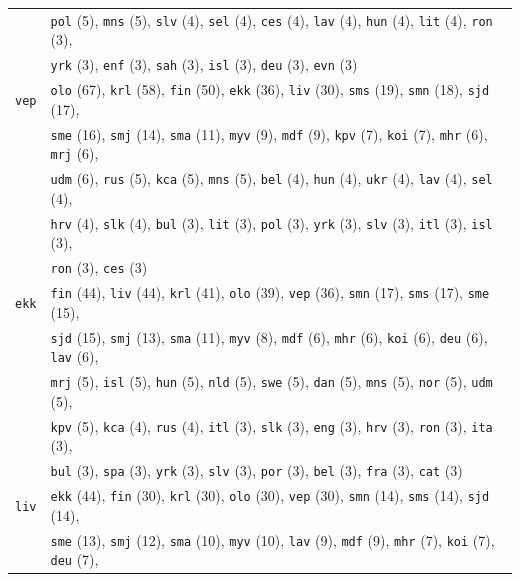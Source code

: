 \begin{center}
\begin{longtable}{ll}
 & \texttt{pol} (5), \texttt{mns} (5), \texttt{slv} (4), \texttt{sel} (4), \texttt{ces} (4), \texttt{lav} (4), \texttt{hun} (4), \texttt{lit} (4), \texttt{ron} (3),\\
 & \texttt{yrk} (3), \texttt{enf} (3), \texttt{sah} (3), \texttt{isl} (3), \texttt{deu} (3), \texttt{evn} (3) \\
\texttt{vep} & \texttt{olo} (67), \texttt{krl} (58), \texttt{fin} (50), \texttt{ekk} (36), \texttt{liv} (30), \texttt{sms} (19), \texttt{smn} (18), \texttt{sjd} (17),\\
 & \texttt{sme} (16), \texttt{smj} (14), \texttt{sma} (11), \texttt{myv} (9), \texttt{mdf} (9), \texttt{kpv} (7), \texttt{koi} (7), \texttt{mhr} (6), \texttt{mrj} (6),\\
 & \texttt{udm} (6), \texttt{rus} (5), \texttt{kca} (5), \texttt{mns} (5), \texttt{bel} (4), \texttt{hun} (4), \texttt{ukr} (4), \texttt{lav} (4), \texttt{sel} (4),\\
 & \texttt{hrv} (4), \texttt{slk} (4), \texttt{bul} (3), \texttt{lit} (3), \texttt{pol} (3), \texttt{yrk} (3), \texttt{slv} (3), \texttt{itl} (3), \texttt{isl} (3),\\
 & \texttt{ron} (3), \texttt{ces} (3) \\
\texttt{ekk} & \texttt{fin} (44), \texttt{liv} (44), \texttt{krl} (41), \texttt{olo} (39), \texttt{vep} (36), \texttt{smn} (17), \texttt{sms} (17), \texttt{sme} (15),\\
 & \texttt{sjd} (15), \texttt{smj} (13), \texttt{sma} (11), \texttt{myv} (8), \texttt{mdf} (6), \texttt{mhr} (6), \texttt{koi} (6), \texttt{deu} (6), \texttt{lav} (6),\\
 & \texttt{mrj} (5), \texttt{isl} (5), \texttt{hun} (5), \texttt{nld} (5), \texttt{swe} (5), \texttt{dan} (5), \texttt{mns} (5), \texttt{nor} (5), \texttt{udm} (5),\\
 & \texttt{kpv} (5), \texttt{kca} (4), \texttt{rus} (4), \texttt{itl} (3), \texttt{slk} (3), \texttt{eng} (3), \texttt{hrv} (3), \texttt{ron} (3), \texttt{ita} (3),\\
 & \texttt{bul} (3), \texttt{spa} (3), \texttt{yrk} (3), \texttt{slv} (3), \texttt{por} (3), \texttt{bel} (3), \texttt{fra} (3), \texttt{cat} (3) \\
\texttt{liv} & \texttt{ekk} (44), \texttt{fin} (30), \texttt{krl} (30), \texttt{olo} (30), \texttt{vep} (30), \texttt{smn} (14), \texttt{sms} (14), \texttt{sjd} (14),\\
 & \texttt{sme} (13), \texttt{smj} (12), \texttt{sma} (10), \texttt{myv} (10), \texttt{lav} (9), \texttt{mdf} (9), \texttt{mhr} (7), \texttt{koi} (7), \texttt{deu} (7),\\

\end{longtable}
\end{center}
